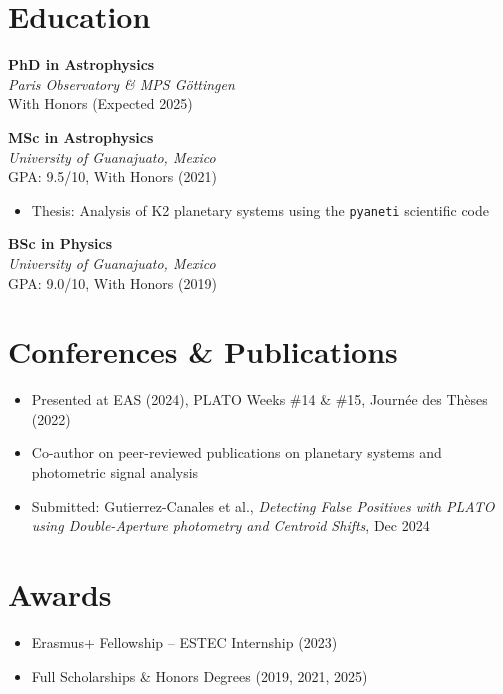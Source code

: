 \documentclass[10pt,a4paper]{article}
\begin{document}
\section*{Education}

\textbf{PhD in Astrophysics} \\
\textit{Paris Observatory \& MPS Göttingen} \\
With Honors (Expected 2025)

\vspace{0.5em}

\textbf{MSc in Astrophysics} \\
\textit{University of Guanajuato, Mexico} \\
GPA: 9.5/10, With Honors (2021)

\begin{itemize}[leftmargin=1.5em]
    \item Thesis: Analysis of K2 planetary systems using the \texttt{pyaneti} scientific code
\end{itemize}

\textbf{BSc in Physics} \\
\textit{University of Guanajuato, Mexico} \\
GPA: 9.0/10, With Honors (2019)

\section*{Conferences \& Publications}
\begin{itemize}[leftmargin=1.5em]
    \item Presented at EAS (2024), PLATO Weeks \#14 \& \#15, Journée des Thèses (2022)
    \item Co-author on peer-reviewed publications on planetary systems and photometric signal analysis
    \item Submitted: Gutierrez-Canales et al., \textit{Detecting False Positives with PLATO using Double-Aperture photometry and Centroid Shifts}, Dec 2024
\end{itemize}

\section*{Awards}
\begin{itemize}[leftmargin=1.5em]
    \item Erasmus+ Fellowship -- ESTEC Internship (2023)
    \item Full Scholarships \& Honors Degrees (2019, 2021, 2025)
\end{itemize}
\end{document}
